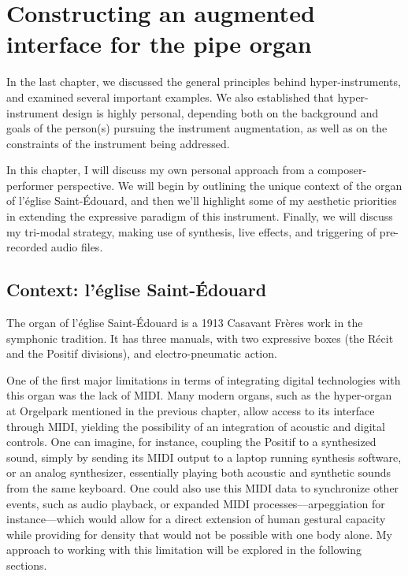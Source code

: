 \documentclass[12pt,twoside,maitrise]{dms_ks}
\theoremstyle{definition}
\begin{document}
{\chapter{Constructing an augmented interface for the pipe organ}

In the last chapter, we discussed the general principles behind hyper-instruments, and examined several important examples. 
We also established that hyper-instrument design is highly personal, depending both on the background and goals of the person(s) pursuing the instrument augmentation, as well as on the constraints of the instrument being addressed. 

In this chapter, I will discuss my own personal approach from a composer-performer perspective. We will begin by outlining the unique context of the organ of l'église Saint-Édouard, and then we'll highlight some of my aesthetic priorities in extending the expressive paradigm of this instrument. Finally, we will discuss my tri-modal strategy, making use of synthesis, live effects, and triggering of pre-recorded audio files. 

\section{Context: l'église Saint-Édouard}

The organ of l'église Saint-Édouard is a 1913 Casavant Frères work in the symphonic tradition. 
It has three manuals, with two expressive boxes (the Récit and the Positif divisions), and electro-pneumatic action. 

One of the first major limitations in terms of integrating digital technologies with this organ was the lack of MIDI. 
Many modern organs, such as the hyper-organ at Orgelpark mentioned in the previous chapter, allow access to its interface through MIDI, yielding the possibility of an integration of acoustic and digital controls. 
One can imagine, for instance, coupling the Positif to a synthesized sound, simply by sending its MIDI output to a laptop running synthesis software, or an analog synthesizer, essentially playing both acoustic and synthetic sounds from the same keyboard. 
One could also use this MIDI data to synchronize other events, such as audio playback, or expanded MIDI processes---arpeggiation for instance---which would allow for a direct extension of human gestural capacity while providing for density that would not be possible with one body alone.
My approach to working with this limitation will be explored in the following sections.

}
\end{document}
